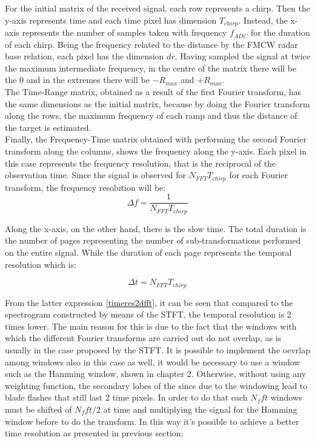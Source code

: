 For the initial matrix of the received signal, each row represents a chirp. Then the y-axis represents time and each time pixel has dimension $T_{chirp}$. Instead, the x-axis represents the number of samples taken with frequency $f_{ADC}$ for the duration of each chirp. Being the frequency related to the distance by the FMCW radar base relation, each pixel has the dimension $dr$. Having sampled the signal at twice the maximum intermediate frequency, in the centre of the matrix there will be the $0$ and in the extremes there will be $-R_{max}$ and $+R_{max}$.\\
The Time-Range matrix, obtained as a result of the first Fourier transform, has the same dimensions as the initial matrix, because by doing the Fourier transform along the rows, the maximum frequency of each ramp and thus the distance of the target is estimated.\\
Finally, the Frequency-Time matrix obtained with performing the second Fourier transform along the columns, shows the frequency along the y-axis. Each pixel in this case represents the frequency resolution, that is the reciprocal of the observation time. Since the signal is observed for $N_{FFT} T_{chirp}$ for each Fourier transform, the frequency resolution will be:
\begin{equation}
\Delta f = \frac{1}{N_{FFT}T_{chirp}}
\end{equation}

Along the x-axis, on the other hand, there is the slow time. The total duration is the number of pages representing the number of sub-transformations performed on the entire signal. While the duration of each page represents the temporal resolution which is:

\begin{equation}
\Delta t = N_{FFT}T_{chirp}
\label{timeres2dfft}
\end{equation}

From the latter expression \ref{timeres2dfft}, it can be seen that compared to the spectrogram constructed by means of the STFT, the temporal resolution is 2 times lower. The main reason for this is due to the fact that the windows with which the different Fourier transforms are carried out do not overlap, as is usually in the case proposed by the STFT. It is possible to implement the oevrlap among windows also in this case as well, it would be necessary to use a window such as the Hamming window, shown in chapter 2. Otherwise, without using any weighting function, the secondary lobes of the sincs due to the windowing lead to blade flashes that still last 2 time pixels. In order to do that each $N_fft$ windows must be shifted of $N_fft/2$ at time and multiplying the signal for the Hamming window before to do the transform. In this way it's possible to achieve a better time resolution as presented in previous section:

